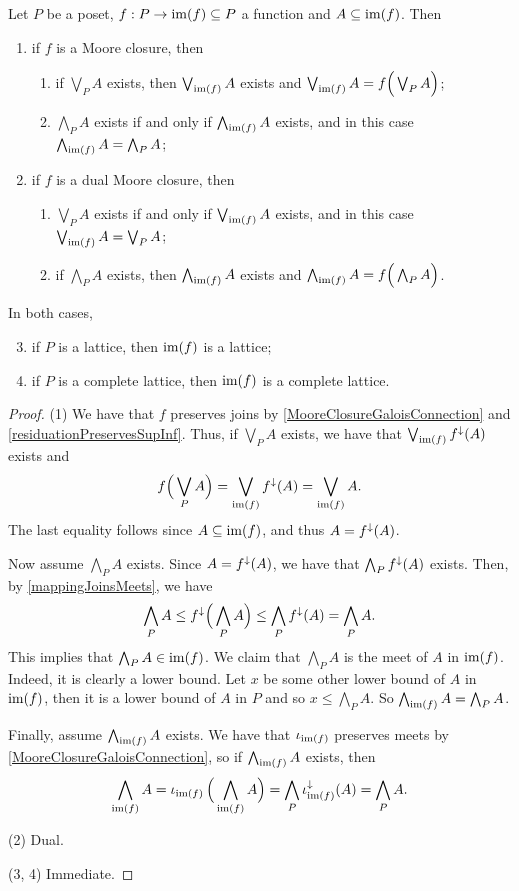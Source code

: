 \begin{proposition} \label{meetJoinImageMooreClosure}
Let $P$ be a poset, $f: P\to \operatorname{im}(f)\subseteq P$ a function and $A\subseteq \operatorname{im}(f)$. Then
\begin{enumerate}
\item if $f$ is a Moore closure, then
\begin{enumerate}
\item if $\bigvee_P A$ exists, then $\bigvee_{\operatorname{im}(f)}A$ exists and $\bigvee_{\operatorname{im}(f)}A = f\Big(\bigvee_P A\Big)$;
\item $\bigwedge_P A$ exists \textup{if and only if} $\bigwedge_{\operatorname{im}(f)} A$ exists, and in this case $\bigwedge_{\operatorname{im}(f)} A = \bigwedge_P A$;
\end{enumerate}
\item if $f$ is a dual Moore closure, then
\begin{enumerate}
\item $\bigvee_P A$ exists \textup{if and only if} $\bigvee_{\operatorname{im}(f)}A$ exists, and in this case $\bigvee_{\operatorname{im}(f)}A = \bigvee_P A$;
\item if $\bigwedge_P A$ exists, then $\bigwedge_{\operatorname{im}(f)} A$ exists and $\bigwedge_{\operatorname{im}(f)} A = f\Big(\bigwedge_P A\Big)$.
\end{enumerate}
\end{enumerate}
In both cases,
\begin{enumerate} \setcounter{enumi}{2}
\item if $P$ is a lattice, then $\operatorname{im}(f)$ is a lattice;
\item if $P$ is a complete lattice, then $\operatorname{im}(f)$ is a complete lattice.
\end{enumerate}
\end{proposition}
\begin{proof}
(1) We have that $f$ preserves joins by \ref{MooreClosureGaloisConnection} and \ref{residuationPreservesSupInf}. Thus, if $\bigvee_P A$ exists, we have that $\bigvee_{\operatorname{im}(f)}f^{\downarrow}(A)$ exists and
\[ f\Big(\bigvee_P A\Big) = \bigvee_{\operatorname{im}(f)}f^{\downarrow}(A) = \bigvee_{\operatorname{im}(f)}A. \]
The last equality follows since $A\subseteq \operatorname{im}(f)$, and thus $A = f^\downarrow(A)$.

Now assume $\bigwedge_P A$ exists. Since $A = f^\downarrow(A)$, we have that $\bigwedge_P f^{\downarrow}(A)$ exists. Then, by \ref{mappingJoinsMeets}, we have
\[ \bigwedge_P A \leq f^\downarrow\Big(\bigwedge_P A\Big) \leq \bigwedge_P f^{\downarrow}(A) = \bigwedge_P A. \]
This implies that $\bigwedge_P A\in\operatorname{im}(f)$. We claim that $\bigwedge_P A$ is the meet of $A$ in $\operatorname{im}(f)$. Indeed, it is clearly a lower bound. Let $x$ be some other lower bound of $A$ in $\operatorname{im}(f)$, then it is a lower bound of $A$ in $P$ and so $x\leq \bigwedge_P A$. So $\bigwedge_{\operatorname{im}(f)} A = \bigwedge_P A$.

Finally, assume $\bigwedge_{\operatorname{im}(f)} A$ exists. We have that $\operatorname{\iota}_{\operatorname{im}(f)}$ preserves meets by \ref{MooreClosureGaloisConnection}, so if $\bigwedge_{\operatorname{im}(f)} A$ exists, then
\[ \bigwedge_{\operatorname{im}(f)} A = \operatorname{\iota}_{\operatorname{im}(f)}\Big(\bigwedge_{\operatorname{im}(f)} A\Big) = \bigwedge_P \operatorname{\iota}_{\operatorname{im}(f)}^\downarrow(A) = \bigwedge_P A. \]

(2) Dual.

(3, 4) Immediate. 
\end{proof}

